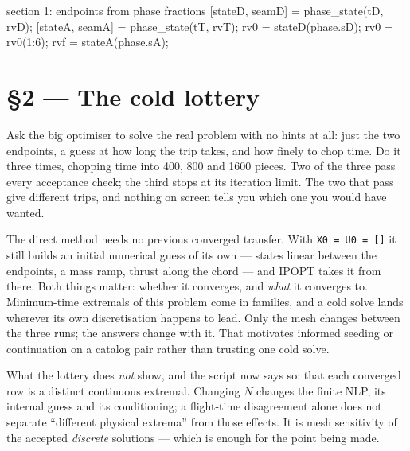 \documentclass[11pt]{article}
\newcommand{\file}[1]{\texttt{#1}}
\begin{document}
\begin{snippet}{section 1: endpoints from phase fractions}
[stateD, seamD] = phase_state(tD, rvD);
[stateA, seamA] = phase_state(tT, rvT);
rv0 = stateD(phase.sD);   rv0 = rv0(1:6);
rvf = stateA(phase.sA);
\end{snippet}

\section{\S2 --- The cold lottery}\label{sec:lottery}

\begin{eli}
Ask the big optimiser to solve the real problem with no hints at all: just
the two endpoints, a guess at how long the trip takes, and how finely to
chop time. Do it three times, chopping time into 400, 800 and 1600 pieces.
Two of the three pass every acceptance check; the third stops at its
iteration limit. The two that pass give different trips, and nothing on
screen tells you which one you would have wanted.
\end{eli}

\begin{intu}
The direct method needs no previous converged transfer. With
\file{X0 = U0 = []} it still builds an initial numerical guess of its own ---
states linear between the endpoints, a mass ramp, thrust along the chord ---
and IPOPT takes it from there. Both things matter: whether it converges, and
\emph{what} it converges to. Minimum-time extremals of this problem come in
families, and a cold solve lands wherever its own discretisation happens to
lead. Only the mesh changes between the three runs; the answers change with
it. That motivates informed seeding or continuation on a catalog pair rather
than trusting one cold solve.

What the lottery does \emph{not} show, and the script now says so: that
each converged row is a distinct continuous extremal. Changing $N$ changes
the finite NLP, its internal guess and its conditioning; a flight-time
disagreement alone does not separate ``different physical extrema'' from
those effects. It is mesh sensitivity of the accepted \emph{discrete}
solutions --- which is enough for the point being made.
\end{intu}
\end{document}

